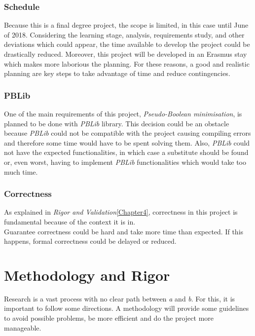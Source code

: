 \subsubsection{Schedule}
Because this is a final degree project, the scope is limited, in this case until June of 2018. Considering the learning stage, analysis, requirements study, and other deviations which could appear, the time available to develop the project could be drastically reduced.  Moreover, this project will be developed in an Erasmus stay which makes more laborious the planning. 
For these reasons, a good and realistic planning are key steps to take advantage of time and reduce contingencies. 

\subsubsection{PBLib}
One of the main requirements of this project, \emph{Pseudo-Boolean minimisation}, is planned to be done with \emph{PBLib} library. This decision could be an obstacle because \emph{PBLib} could not be compatible with the project causing compiling errors and therefore some time would have to be spent solving them. Also, \emph{PBLib} could not have the expected functionalities, in which case a substitute should be found or, even worst, having to implement \emph{PBLib} functionalities which would take too much time. 

\subsubsection{Correctness}
As explained in \emph{Rigor and Validation}\ref{Chapter4}, correctness in this project is fundamental because of the context it is in. \\
Guarantee correctness could be hard and take more time than expected. If this happens, formal correctness could be delayed or reduced. 

\section{Methodology and Rigor}
Research is a vast process with no clear path between \emph{a} and \emph{b}. For this, it is important to follow some directions. A methodology will provide some guidelines to avoid possible problems, be more efficient and do the project more manageable. 

